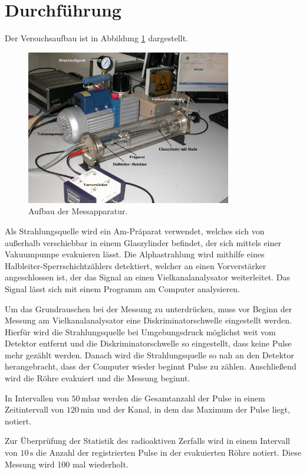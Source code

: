 \section{Durchführung}
\label{sec:Durchführung}

Der Versuchsaufbau ist in Abbildung \ref{fig:aufbau} dargestellt.
\begin{figure}[H]
  \centering
  \includegraphics[width=0.8\textwidth]{aufbau.png}
  \caption{Aufbau der Messapparatur\cite{kent}.}
  \label{fig:aufbau}
\end{figure}

Als Strahlungsquelle wird ein Am-Präparat verwendet, welches sich von außerhalb verschiebbar in 
einem Glaszylinder befindet, der sich mittels einer Vakuumpumpe evakuieren lässt.
Die Alphastrahlung wird mithilfe eines Halbleiter-Sperrschichtzählers detektiert, welcher an
einen Vorverstärker angeschlossen ist, der das Signal an einen Vielkanalanalysator weiterleitet.
Das Signal lässt sich mit einem Programm am Computer analysieren.

Um das Grundrauschen bei der Messung zu unterdrücken, muss vor Beginn der Messung
am Vielkanalanalysator eine Diskriminatorschwelle eingestellt werden. Hierfür wird
die Strahlungsquelle bei Umgebungsdruck möglichst weit vom Detektor entfernt und
die Diskriminatorschwelle so eingestellt, dass keine Pulse mehr gezählt werden.
Danach wird die Strahlungsquelle so nah an den Detektor herangebracht, dass der Computer
wieder beginnt Pulse zu zählen. Anschließend wird die Röhre evakuiert und die Messung beginnt.

In Intervallen von $50\,\si{\milli\bar}$ werden die Gesamtanzahl der Pulse in einem Zeitintervall
von $120\,\si{\minute}$ und der Kanal, in dem das Maximum der Pulse liegt, notiert.

Zur Überprüfung der Statistik des radioaktiven Zerfalls wird in einem Intervall
von $10\,\si{\second}$ die Anzahl der registrierten Pulse in der evakuierten Röhre notiert. Diese
Messung wird 100 mal wiederholt.